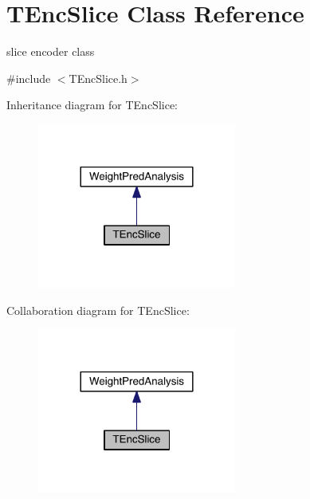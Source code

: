 \hypertarget{class_t_enc_slice}{}\section{T\+Enc\+Slice Class Reference}
\label{class_t_enc_slice}


slice encoder class  




{\ttfamily \#include $<$T\+Enc\+Slice.\+h$>$}



Inheritance diagram for T\+Enc\+Slice\+:
\nopagebreak
\begin{figure}[H]
\begin{center}
\leavevmode
\includegraphics[width=185pt]{db/d0d/class_t_enc_slice__inherit__graph}
\end{center}
\end{figure}


Collaboration diagram for T\+Enc\+Slice\+:
\nopagebreak
\begin{figure}[H]
\begin{center}
\leavevmode
\includegraphics[width=185pt]{d9/d02/class_t_enc_slice__coll__graph}
\end{center}
\end{figure}
